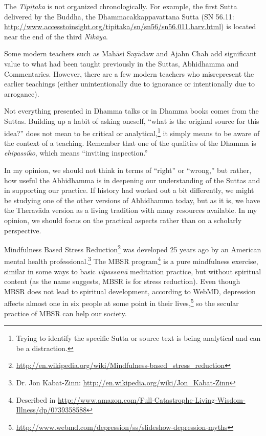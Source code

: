 
The \textit{Tipiṭaka} is not organized chronologically. For example, the first Sutta delivered by the Buddha, the Dhammacakkappavattana Sutta (SN 56.11: \url{http://www.accesstoinsight.org/tipitaka/sn/sn56/sn56.011.harv.html}) is located near the end of the third \textit{Nikāya}.


Some modern teachers such as Mahāsi Sayādaw and Ajahn Chah add significant value to what had been taught previously in the Suttas, Abhidhamma and Commentaries. However, there are a few modern teachers who misrepresent the earlier teachings (either unintentionally due to ignorance or intentionally due to arrogance).

Not everything presented in Dhamma talks or in Dhamma books comes from the Suttas. Building up a habit of asking oneself, “what is the original source for this idea?” does not mean to be critical or analytical,\footnote{Trying to identify the specific Sutta or source text is being analytical and can be a distraction.} it simply means to be aware of the context of a teaching. Remember that one of the qualities of the Dhamma is \textit{ehipassiko}, which means “inviting inspection.” 


In my opinion, we should not think in terms of “right” or “wrong,” but rather, how useful the Abhidhamma is in deepening our understanding of the Suttas and in supporting our practice. If history had worked out a bit differently, we might be studying one of the other versions of Abhidhamma today, but as it is, we have the Theravāda version as a living tradition with many resources available. In my opinion, we should focus on the practical aspects rather than on a scholarly perspective.


Mindfulness Based Stress Reduction\footnote{\url{http://en.wikipedia.org/wiki/Mindfulness-based_stress_reduction}} was developed 25 years ago by an American mental health professional.\footnote{Dr. Jon Kabat-Zinn: \url{http://en.wikipedia.org/wiki/Jon_Kabat-Zinn}} The MBSR program\footnote{Described in \url{http://www.amazon.com/Full-Catastrophe-Living-Wisdom-Illness/dp/0739358588}} is a pure mindfulness exercise, similar in some ways to basic \textit{vipassanā} meditation practice, but without spiritual content (as the name suggests, MBSR is for stress reduction). Even though MBSR does not lead to spiritual development, according to WebMD, depression affects almost one in six people at some point in their lives,\footnote{\url{http://www.webmd.com/depression/ss/slideshow-depression-myths}} so the secular practice of MBSR can help our society. 

